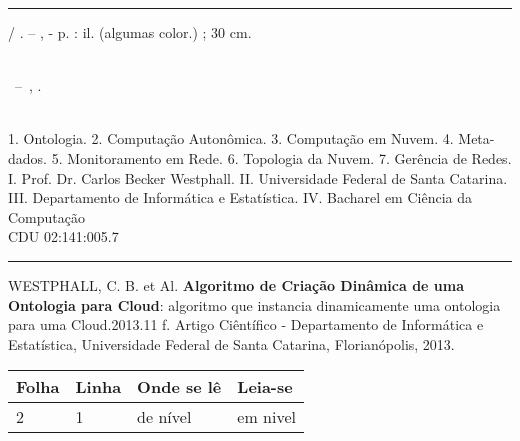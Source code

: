 \documentclass[12pt,openright,twoside,a4paper,english,brazil]{abntex2}
\begin{document}
\begin{fichacatalografica}
	\vspace*{\fill}					%
	\hrule							%
	\begin{center}					%
	\begin{minipage}[c]{12.5cm}		%
	
	\imprimirautor
	
	\hspace{0.5cm} \imprimirtitulo  / \imprimirautor. --
	\imprimirlocal, \imprimirdata-
	\hspace{0.5cm} \pageref{LastPage} p. : il. (algumas color.) ; 30 cm.\\
	
	\hspace{0.5cm} \imprimirorientadorRotulo~\imprimirorientador\\
	
	\hspace{0.5cm}
	\parbox[t]{\textwidth}{\imprimirtipotrabalho~--~\imprimirinstituicao,
	\imprimirdata.}\\
	
	\hspace{0.5cm}
		1. Ontologia.
		2. Computação Autonômica.
		3. Computação em Nuvem.
		4. Meta-dados.
		5. Monitoramento em Rede.
		6. Topologia da Nuvem.
		7. Gerência de Redes.
		I. Prof. Dr. Carlos Becker Westphall.
		II. Universidade Federal de Santa Catarina.
		III. Departamento de Informática e Estatística.
		IV. Bacharel em Ciência da Computação\\ 			
	
	\hspace{8.75cm} CDU 02:141:005.7\\
	
	\end{minipage}
	\end{center}
	\hrule
\end{fichacatalografica}


\begin{errata}
\vspace{\onelineskip}

WESTPHALL, C. B. et Al. \textbf{Algoritmo de Criação Dinâmica de uma Ontologia
para Cloud}: algoritmo que instancia dinamicamente uma ontologia para uma
Cloud.2013.11 f. Artigo Ciêntífico - Departamento de Informática e Estatística,
Universidade Federal de Santa Catarina, Florianópolis, 2013.

\begin{table}[htb]
\center
\footnotesize
\begin{tabular}{|p{1.4cm}|p{1cm}|p{3cm}|p{3cm}|}
  \hline
   \textbf{Folha} & \textbf{Linha}  & \textbf{Onde se lê}  & \textbf{Leia-se}  \\
    \hline
    2 & 1 & de nível & em nivel\\
   \hline
\end{tabular}
\end{table}

\end{errata}
\end{document}

